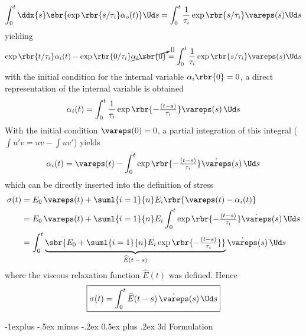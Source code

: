 \documentclass[10pt,landscape]{article}
\makeatletter
\newcommand{\veps}{\vareps}
\renewcommand{\subsection}{\@startsection{subsection}{2}{0mm}%
                                {-1explus -.5ex minus -.2ex}%
                                {0.5ex plus .2ex}%
                                {\normalfont\normalsize\bfseries}}
\makeatother
\begin{document}
\begin{multicols*}{3}
\begin{equation}
  \int_0^t\ddx{s}\sbr{\exp\rbr{s/\tau_i}\alpha_o(t)} \Ud s =
  \int_0^t\frac{1}{\tau_i}\exp\rbr{s/\tau_i}\veps(s)\Ud s
\end{equation}
%
yielding
%
\begin{equation}
  \exp\rbr{t/\tau_i}\alpha_i(t) -
  \exp\rbr{0/\tau_i}\cancelto{0}{\alpha_i\rbr{0}}
  = \int_0^t\frac{1}{\tau_i}\exp\rbr{s/\tau_i}\veps(s)\Ud s
\end{equation}
%
with the initial condition for the internal variable $\alpha_i\rbr{0}=0$, a
direct representation of the internal variable is obtained
%
\begin{equation}
  \alpha_i(t)
  = \int_0^t\frac{1}{\tau_i}\textstyle \exp\rbr{-\frac{(t-s)}{\tau_i}}\veps(s)\,\Ud s
\end{equation}
%
With the initial condition $\veps(0)=0$, a partial integration of this integral
($\int u'v = uv-\int u v'$) yields
%
\begin{equation}
  \alpha_i(t)
  = \veps(t) - \int_0^t\textstyle \exp\rbr{-\frac{(t-s)}{\tau_i}}\dot{\veps}(s)\,\Ud s
\end{equation}
%
which can be directly inserted into the definition of stress
%
\begin{align}
\nonumber \sigma(t) &= E_0\,\veps(t) +
                      \suml{i=1}{n}E_i\rbr{\veps(t)-\alpha_i(t)} \\
  &= E_0\,\veps(t)+ \suml{i=1}{n} E_i \int_0^t\textstyle
    \exp\rbr{-\frac{(t-s)}{\tau_i}}\dot{\veps}(s)\,\Ud s \\
  &= \int_0^t \underbrace{\sbr{E_0 + \suml{i=1}{n} E_i \textstyle
    \exp\rbr{-\frac{(t-s)}{\tau_i}}}}_\text{$\widehat{E}(t-s)$}
    \dot{\veps}(s)\,\Ud s
\end{align}
%
where the viscous relaxation function $\widehat{E}(t)$ was defined. Hence
%
\begin{equation}
  \boxed{\sigma(t) = \int_0^t \widehat{E}(t-s)\, \dot{\veps}(s)\,\Ud s}
\end{equation}

\subsection{3d Formulation}

\end{multicols*}
\end{document}
